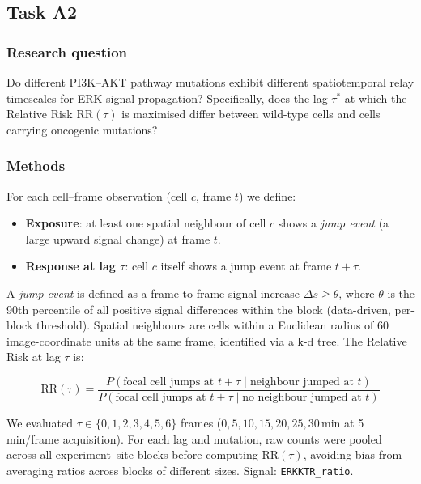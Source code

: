 \documentclass{article}
\begin{document}
\subsection{Task A2}

\subsubsection{Research question}

Do different PI3K--AKT pathway mutations exhibit different spatiotemporal relay
timescales for ERK signal propagation?
Specifically, does the lag $\tau^*$ at which the Relative Risk $\mathrm{RR}(\tau)$
is maximised differ between wild-type cells and cells carrying oncogenic mutations?

\subsubsection{Methods}

For each cell--frame observation (cell $c$, frame $t$) we define:
\begin{itemize}
  \item \textbf{Exposure}: at least one spatial neighbour of cell $c$ shows a
        \emph{jump event} (a large upward signal change) at frame $t$.
  \item \textbf{Response at lag $\tau$}: cell $c$ itself shows a jump event at
        frame $t + \tau$.
\end{itemize}

A \emph{jump event} is defined as a frame-to-frame signal increase
$\Delta s \geq \theta$, where $\theta$ is the 90th percentile of all positive
signal differences within the block (data-driven, per-block threshold).
Spatial neighbours are cells within a Euclidean radius of 60 image-coordinate
units at the same frame, identified via a k-d tree.
The Relative Risk at lag $\tau$ is:

\begin{equation}
  \mathrm{RR}(\tau) =
  \frac{P(\text{focal cell jumps at } t+\tau \mid \text{neighbour jumped at } t)}
       {P(\text{focal cell jumps at } t+\tau \mid \text{no neighbour jumped at } t)}
\end{equation}

We evaluated $\tau \in \{0,1,2,3,4,5,6\}$ frames
($0, 5, 10, 15, 20, 25, 30$\,min at 5\,min/frame acquisition).
For each lag and mutation, raw counts were pooled across all
experiment--site blocks before computing $\mathrm{RR}(\tau)$, avoiding bias from
averaging ratios across blocks of different sizes.
Signal: \texttt{ERKKTR\_ratio}.
\end{document}
